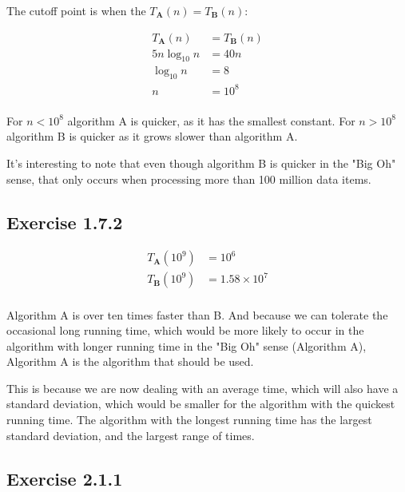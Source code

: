 \documentclass{article}
\begin{document}
The cutoff point is when the \(T_{\textbf{A}}(n) = T_{\textbf{B}}(n)\):

\begin{align*}
T_{\textbf{A}}(n) &= T_{\textbf{B}}(n)\\
5n\log_{10}{n} &= 40n \\
\log_{10}{n} &= 8 \\
n &= 10^8 \\ 
\end{align*}

For \(n < 10^8\) algorithm A is quicker, as it has the smallest constant. For \(n > 10^8\) algorithm B is quicker as it grows slower than algorithm A.

It's interesting to note that even though algorithm B is quicker in the "Big Oh" sense, that only occurs when processing more than 100 million data items. 


\subsection*{Exercise 1.7.2}

\begin{align*}
T_{\textbf{A}}(10^9) &= 10^6 \\
T_{\textbf{B}}(10^9) &= 1.58 \times 10^7 \\
\end{align*}

Algorithm A is over ten times faster than B. And because we can tolerate the occasional long running time, which would be more likely to occur in the algorithm with longer running time in the "Big Oh" sense (Algorithm A), Algorithm A is the algorithm that should be used.

This is because we are now dealing with an average time, which will also have a standard deviation, which would be smaller for the algorithm with the quickest running time. The algorithm with the longest running time has the largest standard deviation, and the largest range of times.



\subsection*{Exercise 2.1.1}
\end{document}
